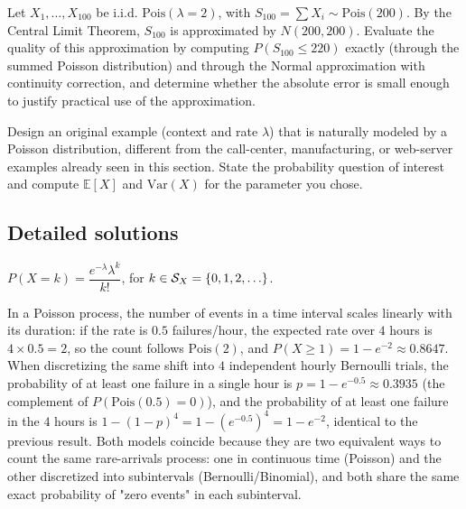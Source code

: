 \begin{problema}
	\label{prob:5e9408a}
	Let $X_1,\dots,X_{100}$ be i.i.d. $\text{Pois}(\lambda=2)$, with $S_{100}=\sum X_i \sim \text{Pois}(200)$. By the Central Limit Theorem, $S_{100}$ is approximated by $N(200,200)$. Evaluate the quality of this approximation by computing $P(S_{100}\le220)$ exactly (through the summed Poisson distribution) and through the Normal approximation with continuity correction, and determine whether the absolute error is small enough to justify practical use of the approximation.
\end{problema}

\begin{problema}
	\label{prob:9dc367e}
	Design an original example (context and rate $\lambda$) that is naturally modeled by a Poisson distribution, different from the call-center, manufacturing, or web-server examples already seen in this section. State the probability question of interest and compute $\mathbb{E}[X]$ and $\text{Var}(X)$ for the parameter you chose.
\end{problema}

\subsection*{Detailed solutions}

\begin{solproblema}[prob:06f83cc]
	$P(X=k) = \dfrac{e^{-\lambda}\lambda^k}{k!}$, for $k \in \mathcal{S}_X = \set{0,1,2,\dots}$.
\end{solproblema}

\begin{solproblema}
	In a Poisson process, the number of events in a time interval scales linearly with its duration: if the rate is $0.5$ failures/hour, the expected rate over $4$ hours is $4\times0.5=2$, so the count follows $\text{Pois}(2)$, and $P(X\ge1)=1-e^{-2}\approx0.8647$. When discretizing the same shift into $4$ independent hourly Bernoulli trials, the probability of at least one failure in a single hour is $p=1-e^{-0.5}\approx0.3935$ (the complement of $P(\text{Pois}(0.5)=0)$), and the probability of at least one failure in the $4$ hours is $1-(1-p)^4 = 1-(e^{-0.5})^4 = 1-e^{-2}$, identical to the previous result. Both models coincide because they are two equivalent ways to count the same rare-arrivals process: one in continuous time (Poisson) and the other discretized into subintervals (Bernoulli/Binomial), and both share the same exact probability of "zero events" in each subinterval.
\end{solproblema}

